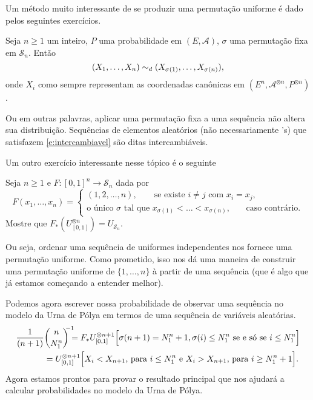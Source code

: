 \begin{topics}
Um método muito interessante de se produzir uma permutação uniforme é dado pelos seguintes exercícios.

\begin{exercise}
  Seja $n \geq 1$ um inteiro, $P$ uma probabilidade em $(E, \mathcal{A})$, $\sigma$ uma permutação fixa em $\mathcal{S}_n$.
  Então
  \begin{equation}
    \label{e:intercambiavel}
    (X_1, \dots, X_n) \sim_d (X_{\sigma(1)}, \dots, X_{\sigma(n)}),
  \end{equation}
  onde $X_i$ como sempre representam as coordenadas canônicas em $(E^{n}, \mathcal{A}^{\otimes n}, P^{\otimes n})$.
\end{exercise}

Ou em outras palavras, aplicar uma permutação fixa a uma sequência \iid não altera sua distribuição.
Sequências de elementos aleatórios (não necessariamente \iid's) que satisfazem \eqref{e:intercambiavel} são ditas intercambiáveis. 

Um outro exercício interessante nesse tópico é o seguinte
\begin{exercise}
  Seja $n \geq 1$ e $F:[0,1]^n \to \mathcal{S}_n$ dada por
  \begin{equation*}
    F(x_1, \dots, x_n) =
    \begin{cases}
      (1, 2, \dots, n), \qquad \text{se existe $i \neq j$ com $x_i = x_j$, }\\
      \text{o único $\sigma$ tal que $x_{\sigma(1)} < \dots < x_{\sigma(n)}$,} \qquad \text{caso contrário.}
    \end{cases}
  \end{equation*}
  Mostre que $F_*(U_{[0,1]}^{\otimes n}) = U_{\mathcal{S}_n}$.
\end{exercise}

Ou seja, ordenar uma sequência de uniformes independentes nos fornece uma permutação uniforme.
Como prometido, isso nos dá uma maneira de construir uma permutação uniforme de $\{1, \dots, n\}$ à partir de uma sequência \iid (que é algo que já estamos começando a entender melhor).

Podemos agora escrever nossa probabilidade de observar uma sequência no modelo da Urna de Pólya em termos de uma sequência \iid de variáveis aleatórias.
\begin{equation*}
  \begin{split}
    \frac{1}{(n+1)} & \binom{n}{N^n_1}^{\mathclap{\;-1}} =
    F_{*} U_{[0,1]}^{\otimes n+1} \Big[ \sigma(n+1) = N^n_1 + 1, \sigma(i) \leq N^n_1 \text{ se e só se } i \leq N^n_1 \Big]\\
    & =  U^{\otimes n+1}_{[0,1]} \Big[ \text{$X_i < X_{n+1}$, para $i \leq N^n_1$ e $X_i > X_{n+1}$, para $i \ge N^n_1+1$} \Big].
  \end{split}
\end{equation*}
Agora estamos prontos para provar o resultado principal que nos ajudará a calcular probabilidades no modelo da Urna de Pólya.


\end{topics}
